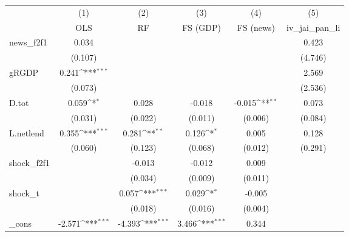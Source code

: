 {
\def\sym#1{\ifmmode^{#1}\else\(^{#1}\)\fi}
\begin{tabular}{l*{5}{c}}
\toprule
            &\multicolumn{1}{c}{(1)}&\multicolumn{1}{c}{(2)}&\multicolumn{1}{c}{(3)}&\multicolumn{1}{c}{(4)}&\multicolumn{1}{c}{(5)}\\
            &\multicolumn{1}{c}{OLS}&\multicolumn{1}{c}{RF}&\multicolumn{1}{c}{FS (GDP)}&\multicolumn{1}{c}{FS (news)}&\multicolumn{1}{c}{iv\_jai\_pan\_li}\\
\midrule
news\_f2f1   &       0.034         &                     &                     &                     &       0.423         \\
            &     (0.107)         &                     &                     &                     &     (4.746)         \\
\addlinespace
gRGDP       &       0.241\sym{***}&                     &                     &                     &       2.569         \\
            &     (0.073)         &                     &                     &                     &     (2.536)         \\
\addlinespace
D.tot       &       0.059\sym{*}  &       0.028         &      -0.018         &      -0.015\sym{**} &       0.073         \\
            &     (0.031)         &     (0.022)         &     (0.011)         &     (0.006)         &     (0.084)         \\
\addlinespace
L.netlend   &       0.355\sym{***}&       0.281\sym{**} &       0.126\sym{*}  &       0.005         &       0.128         \\
            &     (0.060)         &     (0.123)         &     (0.068)         &     (0.012)         &     (0.291)         \\
\addlinespace
shock\_f2f1  &                     &      -0.013         &      -0.012         &       0.009         &                     \\
            &                     &     (0.034)         &     (0.009)         &     (0.011)         &                     \\
\addlinespace
shock\_t     &                     &       0.057\sym{***}&       0.029\sym{*}  &      -0.005         &                     \\
            &                     &     (0.018)         &     (0.016)         &     (0.004)         &                     \\
\addlinespace
\_cons      &      -2.571\sym{***}&      -4.393\sym{***}&       3.466\sym{***}&       0.344         &                     \\

\end{tabular}}
